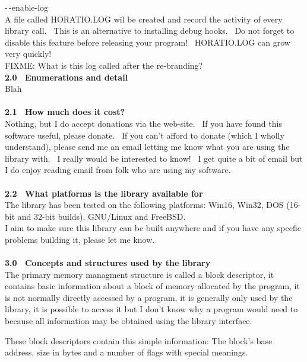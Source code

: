 \documentclass{article}
\begin{document}
\par -$\,$-enable-log
\\
A file called HORATIO.LOG wil be created and record the activity of
every library call.~ This is an alternative to installing debug
hooks.~ Do not forget to disable this feature before releasing
your program!~ HORATIO.LOG can grow very quickly!\\
FIXME: What is this log called after the re-branding?
\\
\textbf{2.0~ Enumerations and detail}\\
Blah\\
\\
\textbf{2.1~ How much does it cost?}
\\
Nothing, but I do accept donations via the web-site.~ If you have
found this software useful, please donate.~ If you can't afford to
donate (which I wholly understand), please send me an email letting me
know what you are using the library with.~ I really would be
interested to know!~ I get quite a bit of email but I do enjoy
reading email from folk who are using my software.\\
\\
\textbf{2.2~ What platforms is the library available for}
\\
The library has been tested on the following platforms: Win16, Win32,
DOS (16-bit and 32-bit builds), GNU/Linux and FreeBSD.\\
I aim to make sure this library can be built anywhere and if you have
any specfic problems building it, please let me know.\\
\\
\textbf{3.0~ Concepts and structures used by the library}
\\
The primary memory managment structure is called a block descriptor,
it contains basic information about a block of memory allocated by the
program, it is not normally directly accessed by a program, it is
generally
only used by the library, it is possible to access it but I don't know
why a program would need to because all information may be obtained
using
the library interface.
\par These block descriptors contain this simple information: The block's
base address, size in bytes and a number of flags with special
meanings.
\end{document}
